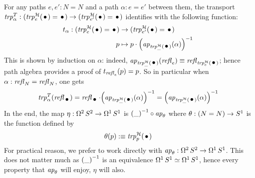 \documentclass[english,a4]{article}
\newcommand{\Sp}{{S^2}}%
\def\blank{\_}%
\begin{document}
For any paths $e,e':N=N$ and a path $\alpha: e=e'$ between them, the
transport
$\trp[T]{\alpha}:(\trp[\hopffam]{e}(\base) = \base) \to (\trp[\hopffam]{e'}(\base) =
\base)$ identifies with the following function:
\begin{equation}
  \begin{aligned}
    {t_\alpha}: (\trp[\hopffam]{e}(\base) = \base) &\to (\trp[\hopffam]{e'}(\base) = \base)
    \\
    p &\mapsto p\cdot \inv{\left(\ap{\trp[\hopffam]{\blank}(\base)}(\alpha)\right)}
  \end{aligned}
\end{equation}
This is shown by induction on $\alpha$: indeed,
$\ap{\trp[\hopffam]{\blank}(\base)}(\refl{e}) \jdeq \refl{\trp[\hopffam]{e}(\base)}$; hence
path algebra provides a proof of $t_{\mathop{{\mathit{refl}}_{e}}}(p) = p$. So in
particular when $\alpha:\mathop{{\mathit{refl}}_{N}} = \mathop{{\mathit{refl}}_{N}}$, one gets
\begin{equation}\label{eq:trp-Ta(refl)}
  \trp[T]{\alpha}(\refl \base) = \refl \base \cdot \inv{\left(\ap{\trp[\hopffam]{\blank}(\base)}(\alpha)\right)}
  = \inv{\left(\ap{\trp[\hopffam]{\blank}(\base)}(\alpha)\right)}
\end{equation}
In the end, the map $\eta\from \loopspace 2 \Sp \to \loopspace 1 \Sc$
is $\inv{(\blank)} \circ \ap \theta$ where $\theta : (N=N) \to {S^1}$ is the function defined by
\begin{equation}
  \label{eq:17}
  \theta(p) \defequi \trp[\hopffam]{p}(\base)
\end{equation}
For practical reason, we prefer to work directly with
$\ap\theta\from \loopspace 2 \Sp \to \loopspace 1 \Sc$. This does not
matter much as $\inv{(\blank)}$ is an equivalence
$\mathop{\Omega^{1}} {S^1} \simeq \mathop{\Omega^{1}} {S^1}$, hence every property that
$\mathop{{\it ap}_{\theta}}$ will enjoy, $\eta$ will also.
\end{document}
